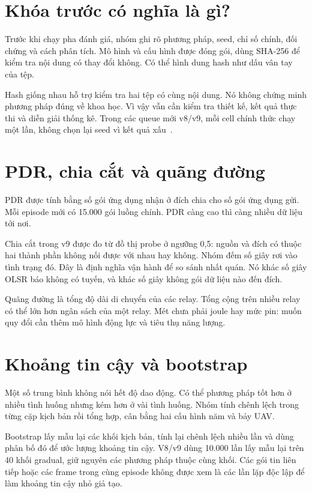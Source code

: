\section{Khóa trước có nghĩa là gì?}
Trước khi chạy pha đánh giá, nhóm ghi rõ phương pháp, seed, chỉ số chính, đối chứng và cách phân tích. Mô hình và cấu hình được đóng gói, dùng SHA-256 để kiểm tra nội dung có thay đổi không. Có thể hình dung hash như dấu vân tay của tệp.

Hash giống nhau hỗ trợ kiểm tra hai tệp có cùng nội dung. Nó không chứng minh phương pháp đúng về khoa học. Vì vậy vẫn cần kiểm tra thiết kế, kết quả thực thi và diễn giải thống kê. Trong các queue mới v8/v9, mỗi cell chính thức chạy một lần, không chọn lại seed vì kết quả xấu~\cite{repro}.

\section{PDR, chia cắt và quãng đường}
PDR được tính bằng số gói ứng dụng nhận ở đích chia cho số gói ứng dụng gửi. Mỗi episode mới có 15.000 gói luồng chính. PDR càng cao thì càng nhiều dữ liệu tới nơi.


Chia cắt trong v9 được đo từ đồ thị probe ở ngưỡng 0,5: nguồn và đích có thuộc hai thành phần không nối được với nhau hay không. Nhóm đếm số giây rơi vào tình trạng đó. Đây là định nghĩa vận hành để so sánh nhất quán. Nó khác số giây OLSR báo không có tuyến, và khác số giây không gói dữ liệu nào đến đích.

Quãng đường là tổng độ dài di chuyển của các relay. Tổng cộng trên nhiều relay có thể lớn hơn ngân sách của một relay. Mét chưa phải joule hay mức pin: muốn quy đổi cần thêm mô hình động lực và tiêu thụ năng lượng.

\section{Khoảng tin cậy và bootstrap}
Một số trung bình không nói hết độ dao động. Có thể phương pháp tốt hơn ở nhiều tình huống nhưng kém hơn ở vài tình huống. Nhóm tính chênh lệch trong từng cặp kịch bản rồi tổng hợp, cân bằng hai cấu hình năm và bảy UAV.

Bootstrap lấy mẫu lại các khối kịch bản, tính lại chênh lệch nhiều lần và dùng phân bố đó để ước lượng khoảng tin cậy. V8/v9 dùng 10.000 lần lấy mẫu lại trên 40 khối gradual, giữ nguyên các phương pháp thuộc cùng khối. Các gói tin liên tiếp hoặc các frame trong cùng episode không được xem là các lần lặp độc lập để làm khoảng tin cậy nhỏ giả tạo.


